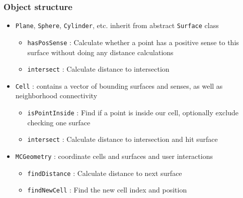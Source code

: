 \documentclass{beamer}
\begin{document}
\begin{frame}
\frametitle{Object structure}
\begin{itemize}
  \item \texttt{Plane}, \texttt{Sphere},
        \texttt{Cylinder}, etc. inherit from abstract \texttt{Surface} class
    \begin{itemize}
      \item \texttt{hasPosSense}
        : Calculate whether a point has a positive sense to this
        surface without doing any distance calculations
      \item \texttt{intersect}
        : Calculate distance to intersection
    \end{itemize}
  \item \texttt{Cell} : contains a vector of bounding surfaces and senses, as
    well as neighborhood connectivity
    \begin{itemize}
      \item \texttt{isPointInside}
        : Find if a point is inside our cell, optionally exclude checking one
        surface
      \item \texttt{intersect}
        : Calculate distance to intersection and hit surface
    \end{itemize}
  \item \texttt{MCGeometry} : coordinate cells and surfaces and user
    interactions
    \begin{itemize}
      \item \texttt{findDistance}
        : Calculate distance to next surface
      \item \texttt{findNewCell}
        : Find the new cell index and position
    \end{itemize}
\end{itemize}
\end{frame}
\end{document}
